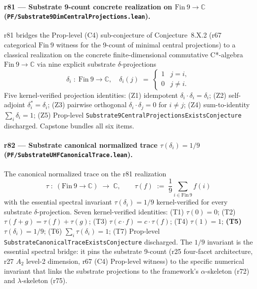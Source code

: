 \documentclass[11pt,a4paper]{amsart}
\theoremstyle{plain}
\theoremstyle{definition}
\begin{document}
\paragraph{r81 --- Substrate 9-count concrete realization on $\mathrm{Fin}~9 \to \mathbb{C}$ (\texttt{PF/Substrate9DimCentralProjections.lean}).} r81 bridges the Prop-level (C4) sub-conjecture of Conjecture~8.X.2 (r67 categorical $\mathrm{Fin}~9$ witness for the 9-count of minimal central projections) to a classical realization on the concrete finite-dimensional commutative C*-algebra $\mathrm{Fin}~9 \to \mathbb{C}$ via nine explicit substrate $\delta$-projections
\[
\delta_i \; : \; \mathrm{Fin}~9 \to \mathbb{C}, \quad \delta_i(j) \;=\; \begin{cases} 1 & j = i, \\ 0 & j \ne i. \end{cases}
\]
Five kernel-verified projection identities: (Z1) idempotent $\delta_i \cdot \delta_i = \delta_i$; (Z2) self-adjoint $\delta_i^* = \delta_i$; (Z3) pairwise orthogonal $\delta_i \cdot \delta_j = 0$ for $i \ne j$; (Z4) sum-to-identity $\sum_i \delta_i = 1$; (Z5) Prop-level \texttt{Substrate9CentralProjectionsExistsConjecture} discharged. Capstone  bundles all six items.

\paragraph{r82 --- Substrate canonical normalized trace $\tau(\delta_i) = 1/9$ (\texttt{PF/SubstrateUHFCanonicalTrace.lean}).} The canonical normalized trace on the r81 realization
\[
\tau \; : \; (\mathrm{Fin}~9 \to \mathbb{C}) \; \to \; \mathbb{C}, \qquad \tau(f) \;:=\; \frac{1}{9} \sum_{i \in \mathrm{Fin}~9} f(i)
\]
with the essential spectral invariant $\tau(\delta_i) = 1/9$ kernel-verified for every substrate $\delta$-projection. Seven kernel-verified identities: (T1) $\tau(0) = 0$; (T2) $\tau(f + g) = \tau(f) + \tau(g)$; (T3) $\tau(c \cdot f) = c \cdot \tau(f)$; (T4) $\tau(1) = 1$; \textbf{(T5) $\tau(\delta_i) = 1/9$}; (T6) $\sum_i \tau(\delta_i) = 1$; (T7) Prop-level \texttt{SubstrateCanonicalTraceExistsConjecture} discharged. The $1/9$ invariant is the essential spectral bridge: it pins the substrate 9-count (r25 four-facet architecture, r27 $A_2$ level-2 dimension, r67 (C4) Prop-level witness) to the specific numerical invariant that links the substrate projections to the framework's $\alpha$-skeleton (r72) and $\lambda$-skeleton (r75).
\end{document}
